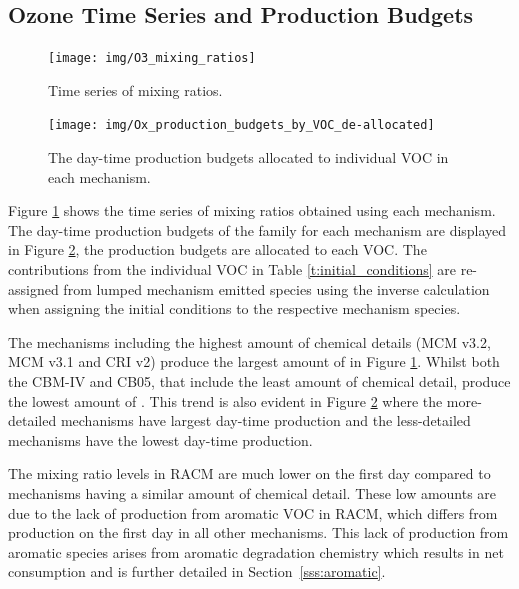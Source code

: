 
\subsection[Ozone Time Series and Ox Production Budgets]{Ozone Time Series and  Production Budgets}

\begin{figure}
    \centering
    \texttt{[image: img/O3\_mixing\_ratios]}
    \vspace{1mm}
    \caption{Time series of  mixing ratios.}
    \vspace{-4mm}
    \label{f:time_series}
\end{figure}

\begin{figure}
    \centering
    \texttt{[image: img/Ox\_production\_budgets\_by\_VOC\_de-allocated]}
    \vspace{1mm}
    \caption{The day-time  production budgets allocated to individual VOC in each mechanism.}
    \vspace{-4mm}
    \label{f:Ox_tagged_budgets}
\end{figure}

Figure \ref{f:time_series} shows the time series of  mixing ratios obtained using each mechanism.
The day-time production budgets of the  family for each mechanism are displayed in Figure \ref{f:Ox_tagged_budgets}, the  production budgets are allocated to each VOC.
The contributions from the individual VOC in Table \ref{t:initial_conditions} are re-assigned from lumped mechanism emitted species using the inverse calculation when assigning the initial conditions to the respective mechanism species.

The mechanisms including the highest amount of chemical details (MCM v3.2, MCM v3.1 and CRI v2) produce the largest amount of  in Figure \ref{f:time_series}.
Whilst both the CBM-IV and CB05, that include the least amount of chemical detail, produce the lowest amount of .
This trend is also evident in Figure \ref{f:Ox_tagged_budgets} where the more-detailed mechanisms have largest day-time  production and the less-detailed mechanisms have the lowest day-time  production.

The  mixing ratio levels in RACM are much lower on the first day compared to mechanisms having a similar amount of chemical detail.
These low  amounts are due to the lack of  production from aromatic VOC in RACM, which differs from  production on the first day in all other mechanisms.
This lack of  production from aromatic species arises from aromatic degradation chemistry which results in net  consumption and is further detailed in \mbox{Section \ref{sss:aromatic}}.

